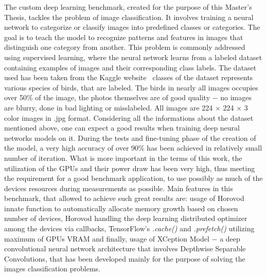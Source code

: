 The custom deep learning benchmark, created for the purpose of this Master's
Thesis, tackles the problem of image classification. It involves training
a neural network to categorize or classify images into predefined classes
or categories. The goal is to teach the model to recognize patterns and
features in images that distinguish one category from another. This problem
is commonly addressed using supervised learning, where the neural network
learns from a labeled dataset containing examples of images and their
corresponding class labels. The dataset used has been taken from the Kaggle
website~\cite{Kaggle_Dataset} classes of the dataset represents various
species of birds, that are labeled. The birds in nearly all images occupies
over 50\% of the image, the photos themselves are of good quality $-$ no images
are blurry, done in bad lighting or misslabeled. All images are 224 $\times$
224 $\times$ 3 color images in \@.jpg format. Considering all the informations
about the dataset mentioned above, one can expect a good results when training
deep neural networks models on it. During the tests and fine-tuning phase of
the creation of the model, a very high accuracy of over 90\% has been achieved
in relatively small number of iteration. What is more important in the terms
of this work, the utilization of the GPUs and their power draw has been very
high, thus meeting the requirement for a good benchmark application, to use
possibly as much of the devices resources during measurements as possible.
Main features in this benchmark, that allowed to achieve such great results
are: usage of Horovod innate function to automatically allocate memory growth
based on chosen number of devices, Horovod handling the deep learning
distributed optimizer among the devices via callbacks, TensorFlow's
\emph{.cache\@()} and \emph{.prefetch\@()} utilizing maximum of GPUs VRAM and
finally, usage of XCeption Model $-$ a deep convolutional neural network
architecture that involves Depthwise Separable Convolutions, that has been
developed mainly for the purpose of solving the images classification problems.




